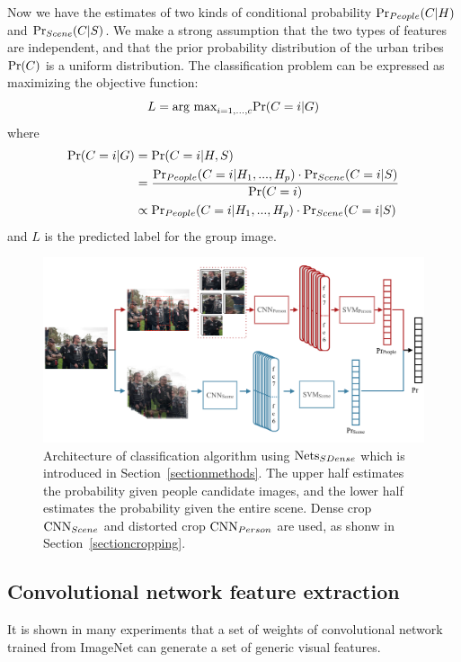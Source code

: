 \documentclass[10pt,twocolumn,letterpaper]{article}
\begin{document}
Now we have the estimates of two kinds of conditional probability $\textup{Pr}_{People}(C|H)$ and $\textup{Pr}_{Scene}(C|S)$. We make a strong assumption that the two types of features are independent, and that the prior probability distribution of the urban tribes $\textup{Pr}(C)$ is a uniform distribution. The classification problem can be expressed as maximizing the objective function:
\begin{equation}
L = \textup{arg max}_{i=1,...,c}\textup{Pr}(C=i|G)
\end{equation}
where
\begin{equation}
\begin{split}
 \textup{Pr}(C=i|G)& =\textup{Pr}(C=i|H, S) \\
  & = \frac{\textup{Pr}_{People}(C=i|H_{1},...,H_{p}) \cdot \textup{Pr}_{Scene}(C=i|S)}{\textup{Pr}(C=i)} \\
  & \propto \textup{Pr}_{People}(C=i|H_{1},...,H_{p}) \cdot \textup{Pr}_{Scene}(C=i|S)
\end{split}
\end{equation}
and $L$ is the predicted label for the group image. 

\begin{figure}[t]
\begin{center}
\includegraphics[width=0.8\linewidth]{flowchart2}
\end{center}
   \caption{Architecture of classification algorithm using $\textup{Nets}_{SDense}$ which is introduced in Section~\ref{sectionmethods}. The upper half estimates the probability given people candidate images, and the lower half estimates the probability given the entire scene. Dense crop $\textup{CNN}_{Scene}$ and distorted crop $\textup{CNN}_{Person}$ are used, as shonw in Section~\ref{sectioncropping}.}
\label{Flowchart}
\end{figure}



\subsection{Convolutional network feature extraction}
\label{sectioncnn}
It is shown in many experiments that a set of weights of convolutional network trained from ImageNet can generate a set of generic visual features.
\end{document}
